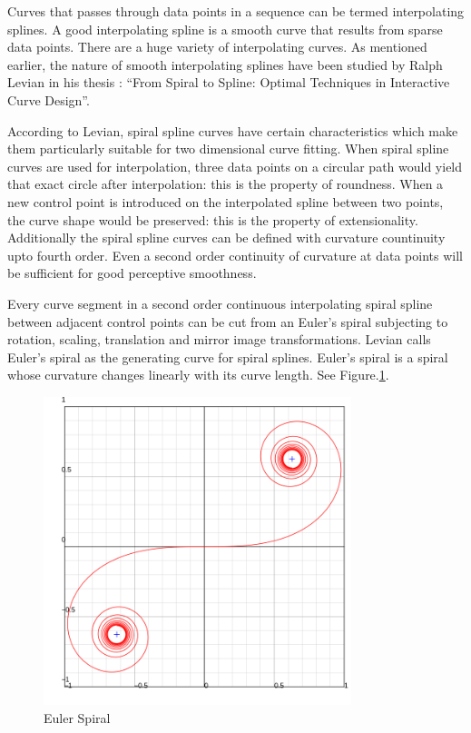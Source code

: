\documentclass[10pt]{article}
\begin{document}
Curves that passes through data points in a sequence can be termed interpolating splines. A good interpolating spline is a smooth curve that results from sparse data points. There are a huge variety  of interpolating curves. As mentioned earlier, the nature of smooth interpolating splines have been studied by Ralph Levian in his thesis : “From Spiral to Spline: Optimal Techniques in Interactive Curve Design”\cite{levian}.

According to Levian, spiral spline curves have certain characteristics which make them particularly suitable for two dimensional curve fitting. When spiral spline curves are used for interpolation, three data points on a circular path would yield that exact circle after interpolation: this is the property of roundness. When a new control point is introduced on the interpolated spline between two points, the curve shape would be preserved: this is the property of extensionality. Additionally the spiral spline curves can be defined with curvature countinuity upto fourth order. Even a second order continuity of curvature at data points will be sufficient for good perceptive smoothness.

Every curve segment in a second order continuous interpolating spiral spline between adjacent control points can be cut from an Euler’s spiral subjecting to rotation, scaling, translation and mirror image transformations. Levian calls Euler’s spiral as the generating curve for spiral splines. Euler’s spiral is a spiral whose curvature changes linearly with its curve length. See Figure.\ref{eulerspiral}. 

\begin{figure}
	\centering
	\includegraphics[width=0.8\textwidth]{images/Euler_spiral.png}
	\caption{Euler Spiral}
	\label{eulerspiral}
\end{figure}
\end{document}
